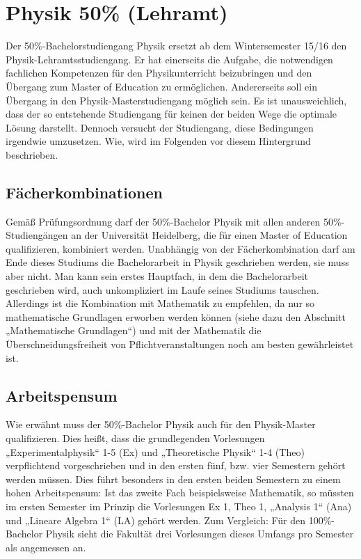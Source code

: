 \section{Physik 50\% (Lehramt)} %

Der 50\%-Bachelorstudiengang Physik ersetzt ab dem Wintersemester 15/16 den Physik-Lehramtsstudiengang. Er hat einerseits die Aufgabe, die notwendigen fachlichen Kompetenzen für den Physikunterricht beizubringen und den Übergang zum Master of Education zu ermöglichen. Andererseits soll ein Übergang in den Physik-Masterstudiengang möglich sein. Es ist unausweichlich, dass der so entstehende Studiengang für keinen der beiden Wege die optimale Lösung darstellt. Dennoch versucht der Studiengang, diese Bedingungen irgendwie umzusetzen. Wie, wird im Folgenden vor diesem Hintergrund beschrieben.

\subsection{Fächerkombinationen}

Gemäß Prüfungsordnung darf der 50\%-Bachelor Physik mit allen anderen 50\%-Studiengängen an der Universität Heidelberg, die für einen Master of Education qualifizieren, kombiniert werden. Unabhängig von der Fächerkombination darf am Ende dieses Studiums die Bachelorarbeit in Physik geschrieben werden, sie muss aber nicht. Man kann sein erstes Hauptfach, in dem die Bachelorarbeit geschrieben wird, auch unkompliziert im Laufe seines Studiums tauschen. Allerdings ist die Kombination mit Mathematik zu empfehlen, da nur so mathematische Grundlagen erworben werden können (siehe dazu den Abschnitt „Mathematische Grundlagen“) und mit der Mathematik die Überschneidungsfreiheit von Pflichtveranstaltungen noch am besten gewährleistet ist.

\subsection{Arbeitspensum}

Wie erwähnt muss der 50\%-Bachelor Physik auch für den Physik-Master qualifizieren. Dies heißt, dass die grundlegenden Vorlesungen „Experimentalphysik“ 1-5 (\gls{Ex}) und „Theoretische Physik“ 1-4 (\gls{Theo}) verpflichtend vorgeschrieben und in den ersten fünf, bzw. vier Semestern gehört werden müssen. Dies führt besonders in den ersten beiden Semestern zu einem hohen Arbeitspensum: Ist das zweite Fach beispielsweise Mathematik, so müssten im ersten Semester im Prinzip die Vorlesungen Ex 1, Theo 1, „Analysis 1“ (\gls{Ana}) und „Lineare Algebra 1“ (\gls{LA}) gehört werden. Zum Vergleich: Für den 100\%-Bachelor Physik sieht die Fakultät drei Vorlesungen dieses Umfangs pro Semester als angemessen an.

